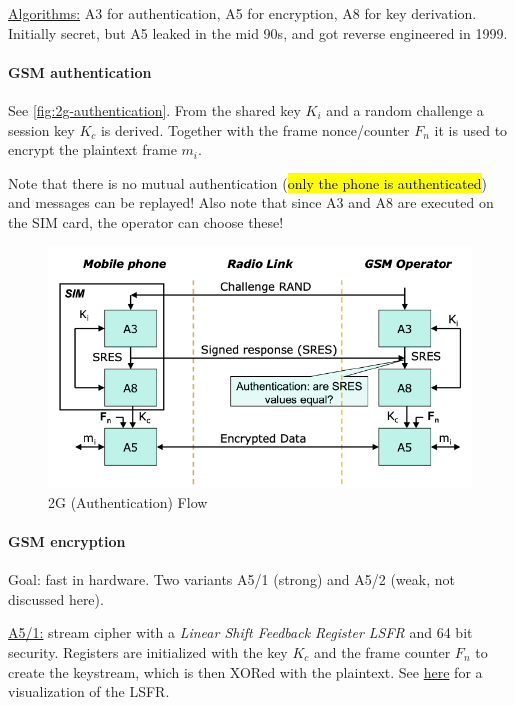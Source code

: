 \underline{Algorithms:}
A3 for authentication, A5 for encryption, A8 for key derivation.
Initially secret, but A5 leaked in the mid 90s, and got reverse engineered in 1999.

\paragraph{GSM authentication}
See \autoref{fig:2g-authentication}. From the shared key $K_i$ and a random
challenge a session key $K_c$ is derived. Together with the frame nonce/counter
$F_n$ it is used to encrypt the plaintext frame $m_i$.

Note that there is no mutual authentication (\hl{only the phone is authenticated})
and messages can be replayed! Also note that since A3 and A8 are executed on
the SIM card, the operator can choose these!

\begin{figure}[h]
	\centering
	\includegraphics[scale=0.5]{images/10-2g-authentication.png}
	\caption{2G (Authentication) Flow}
	\label{fig:2g-authentication}
\end{figure}

\paragraph{GSM encryption}
Goal: fast in hardware. Two variants A5/1 (strong) and A5/2 (weak, not
discussed here).

\underline{A5/1:} stream cipher with a \textit{Linear Shift Feedback Register LSFR} and 64 bit security.
Registers are initialized with the key $K_c$ and the frame counter $F_n$ to create the keystream, which is then XORed with the plaintext.
See \href{https://web.archive.org/web/20120326211404/http:/l-system.net.pl/crypto/A5\_1\_stream\_cipher.svg}{here} for a visualization of the LSFR.

